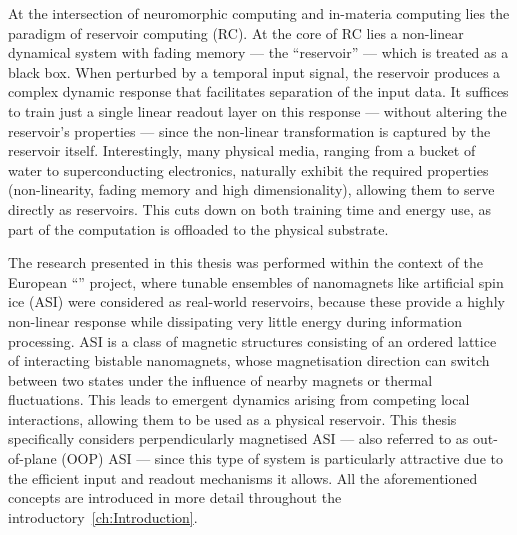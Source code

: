 At the intersection of neuromorphic computing and in-materia computing lies the paradigm of reservoir computing (RC).
At the core of RC lies a non-linear dynamical system with fading memory --- the ``reservoir'' --- which is treated as a black box.
When perturbed by a temporal input signal, the reservoir produces a complex dynamic response that facilitates separation of the input data.
It suffices to train just a single linear readout layer on this response --- without altering the reservoir's properties --- since the non-linear transformation is captured by the reservoir itself.
Interestingly, many physical media, ranging from a bucket of water to superconducting electronics, naturally exhibit the required properties (non-linearity, fading memory and high dimensionality), allowing them to serve directly as reservoirs. %
This cuts down on both training time and energy use, as part of the computation is offloaded to the physical substrate. \par
The research presented in this thesis was performed within the context of the European ``\spinengine'' project, where tunable ensembles of nanomagnets like artificial spin ice (ASI) were considered as real-world reservoirs, because these provide a highly non-linear response while dissipating very little energy during information processing.
ASI is a class of magnetic structures consisting of an ordered lattice of interacting bistable nanomagnets, whose magnetisation direction can switch between two states under the influence of nearby magnets or thermal fluctuations.
This leads to emergent dynamics arising from competing local interactions, allowing them to be used as a physical reservoir.
This thesis specifically considers perpendicularly magnetised ASI --- also referred to as out-of-plane (OOP) ASI --- since this type of system is particularly attractive due to the efficient input and readout mechanisms it allows.
All the aforementioned concepts are introduced in more detail throughout the introductory~\cref{ch:Introduction}. \\

